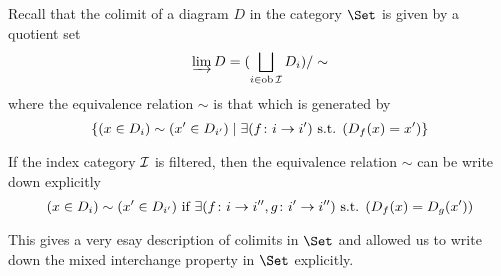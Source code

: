   Recall that the colimit of a diagram $D$ in the category $\Set$ is given by a quotient set
  \begin{equation*}
    \operatorname*{\underrightarrow{\lim}} D = (\bigsqcup_{i\in\operatorname{ob}{\cal I}} D_i)/\sim
  \end{equation*}
  where the equivalence relation $\sim$ is that which is generated by
  \begin{equation*}
    \{(x\in D_i)\sim(x'\in D_{i'})\mid \exists(f\colon i\to i')\textrm{ s.t. }(D_f(x)=x')\}
  \end{equation*}

  If the index category ${\cal I}$ is filtered, then the equivalence relation $\sim$ can be write down explicitly
  \begin{equation*}
    (x\in D_i)\sim(x'\in D_{i'})\text{ if }\exists(f\colon i\to i'',g\colon i'\to i'')\textrm{ s.t. }(D_f(x)=D_g(x'))
  \end{equation*}

  This gives a very esay description of colimits in $\Set$ and allowed us to write down the mixed interchange property in $\Set$ explicitly.

